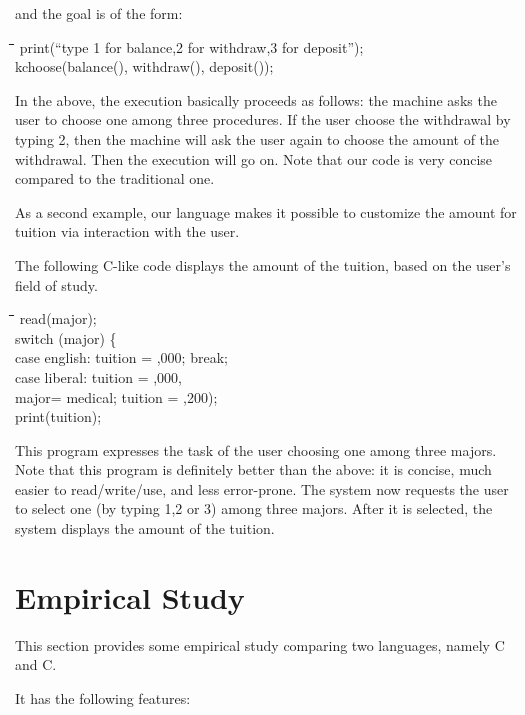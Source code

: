 \documentclass[letter]{ieice}
\newenvironment{exmple}{
 \begingroup \begin{tabbing} \hspace{2em}\= \hspace{3em}\= \hspace{3em}\=
\hspace{3em}\= \hspace{3em}\= \hspace{3em}\= \kill}{
 \end{tabbing}\endgroup}
\newcommand{\muprolog}{{C}}
\newcommand{\kch}{kchoose}
\begin{document}
\noindent and the goal  is of the form:

\begin{exmple}
 print(``type 1 for balance,2 for withdraw,3 for deposit'');\\
\kch(balance(),    withdraw(), deposit());
\end{exmple}
\noindent In the above, the execution
 basically proceeds as follows: the machine asks the user to choose one among three procedures.
If the user choose the withdrawal  by typing 2, then  the machine will ask the user
again to choose the amount of the withdrawal. Then the execution will go on.
Note that our code is very concise compared to the traditional one.


As a second example, our language  makes it possible to customize the amount for tuition via
interaction with the user.

The following C-like code displays the amount of the tuition, based on the user's
field of study.

\begin{exmple}
        read(major); \\
        switch (major) \{ \\
 \>           case english:  tuition = \4,000;   break;\\
 \>           case liberal:  tuition = \2,000, \\
  \>           major= medical;    tuition = \2,200);\\
print(tuition); \\
\end{exmple}

\noindent This program expresses the task of the user choosing one among
three majors.
 Note that this program is definitely better than the above: it is concise, much easier to read/write/use,
 and less error-prone.
 The system now requests the user to select one (by typing 1,2 or 3)
among three majors. After it is selected, 
the system displays the amount of the tuition.



\section{Empirical Study}

This section provides some empirical study 
 comparing two languages, namely C and \muprolog. 

 It has    
the following features:   
\end{document}
